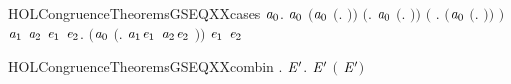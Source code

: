 \begin{SaveVerbatim}{HOLCongruenceTheoremsGSEQXXcases}
\HOLTokenTurnstile{} \HOLSymConst{\HOLTokenForall{}}\ensuremath{\HOLBoundVar{a}\sb{\mathrm{0}}}.
        \ensuremath{\HOLBoundVar{a}\sb{\mathrm{0}}} \HOLSymConst{\HOLTokenEquiv{}}
       \ensuremath{(}\ensuremath{\HOLBoundVar{a}\sb{\mathrm{0}}} \HOLSymConst{\ensuremath{=}} \ensuremath{(}\HOLTokenLambda{}. \ensuremath{)}\ensuremath{)} \HOLSymConst{\HOLTokenDisj{}} \ensuremath{(}\HOLSymConst{\HOLTokenExists{}}. \ensuremath{\HOLBoundVar{a}\sb{\mathrm{0}}} \HOLSymConst{\ensuremath{=}} \ensuremath{(}\HOLTokenLambda{}. \ensuremath{)}\ensuremath{)} \HOLSymConst{\HOLTokenDisj{}}
       \ensuremath{(}\HOLSymConst{\HOLTokenExists{}} . \ensuremath{(}\ensuremath{\HOLBoundVar{a}\sb{\mathrm{0}}} \HOLSymConst{\ensuremath{=}} \ensuremath{(}\HOLTokenLambda{}. \HOLSymConst{\ensuremath{\ldotp}} \ensuremath{)}\ensuremath{)} \HOLSymConst{\HOLTokenConj{}}  \ensuremath{)} \HOLSymConst{\HOLTokenDisj{}}
       \HOLSymConst{\HOLTokenExists{}}\ensuremath{\HOLBoundVar{a}\sb{\mathrm{1}}} \ensuremath{\HOLBoundVar{a}\sb{\mathrm{2}}} \ensuremath{\HOLBoundVar{e}\sb{\mathrm{1}}} \ensuremath{\HOLBoundVar{e}\sb{\mathrm{2}}}.
           \ensuremath{(}\ensuremath{\HOLBoundVar{a}\sb{\mathrm{0}}} \HOLSymConst{\ensuremath{=}} \ensuremath{(}\HOLTokenLambda{}. \ensuremath{\HOLBoundVar{a}\sb{\mathrm{1}}}\HOLSymConst{\ensuremath{\ldotp}}\ensuremath{\HOLBoundVar{e}\sb{\mathrm{1}}}  \HOLSymConst{\ensuremath{+}} \ensuremath{\HOLBoundVar{a}\sb{\mathrm{2}}}\HOLSymConst{\ensuremath{\ldotp}}\ensuremath{\HOLBoundVar{e}\sb{\mathrm{2}}} \ensuremath{)}\ensuremath{)} \HOLSymConst{\HOLTokenConj{}}  \ensuremath{\HOLBoundVar{e}\sb{\mathrm{1}}} \HOLSymConst{\HOLTokenConj{}}  \ensuremath{\HOLBoundVar{e}\sb{\mathrm{2}}}
\end{SaveVerbatim}
\newcommand{\HOLCongruenceTheoremsGSEQXXcases}{\UseVerbatim{HOLCongruenceTheoremsGSEQXXcases}}
\begin{SaveVerbatim}{HOLCongruenceTheoremsGSEQXXcombin}
\HOLTokenTurnstile{} \HOLSymConst{\HOLTokenForall{}}.   \HOLSymConst{\HOLTokenImp{}} \HOLSymConst{\HOLTokenForall{}}\ensuremath{\HOLBoundVar{E}\sp{\prime}}.  \ensuremath{\HOLBoundVar{E}\sp{\prime}} \HOLSymConst{\HOLTokenImp{}}  \ensuremath{(} \HOLConst{\HOLTokenCompose} \ensuremath{\HOLBoundVar{E}\sp{\prime}}\ensuremath{)}
\end{SaveVerbatim}
